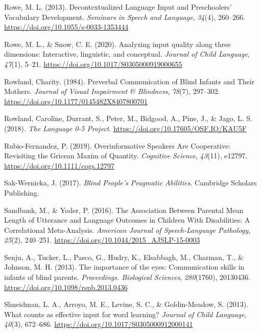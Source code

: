 \documentclass[
  man,floatsintext]{apa6}
\newlength{\cslhangindent}
\newlength{\cslentryspacingunit} %
\newenvironment{CSLReferences}[2] %
 {%
  \setlength{\parindent}{0pt}
  \ifodd #1
  \let\oldpar\par
  \def\par{\hangindent=\cslhangindent\oldpar}
  \fi
  \setlength{\parskip}{#2\cslentryspacingunit}
 }%
 {}
\begin{document}
\begin{CSLReferences}{1}{0}
\leavevmode{}%
Rowe, M. L. (2013). Decontextualized {Language Input} and {Preschoolers}' {Vocabulary Development}. \emph{Seminars in Speech and Language}, \emph{34}(4), 260--266. \url{https://doi.org/10.1055/s-0033-1353444}

\leavevmode{}%
Rowe, M. L., \& Snow, C. E. (2020). Analyzing input quality along three dimensions: Interactive, linguistic, and conceptual. \emph{Journal of Child Language}, \emph{47}(1), 5--21. \url{https://doi.org/10.1017/S0305000919000655}

\leavevmode{}%
Rowland, Charity. (1984). Preverbal {Communication} of {Blind Infants} and {Their Mothers}. \emph{Journal of Visual Impairment \& Blindness}, \emph{78}(7), 297--302. \url{https://doi.org/10.1177/0145482X8407800701}

\leavevmode{}%
Rowland, Caroline, Durrant, S., Peter, M., Bidgood, A., Pine, J., \& Jago, L. S. (2018). \emph{The {Language} 0-5 {Project}}. \url{https://doi.org/10.17605/OSF.IO/KAU5F}

\leavevmode{}%
Rubio-Fernandez, P. (2019). Overinformative {Speakers Are Cooperative}: {Revisiting} the {Gricean Maxim} of {Quantity}. \emph{Cognitive Science}, \emph{43}(11), e12797. \url{https://doi.org/10.1111/cogs.12797}

\leavevmode{}%
Sak-Wernicka, J. (2017). \emph{Blind {People}'s {Pragmatic Abilities}}. Cambridge Scholars Publishing.

\leavevmode{}%
Sandbank, M., \& Yoder, P. (2016). The {Association Between Parental Mean Length} of {Utterance} and {Language Outcomes} in {Children With Disabilities}: {A Correlational Meta-Analysis}. \emph{American Journal of Speech-Language Pathology}, \emph{25}(2), 240--251. \url{https://doi.org/10.1044/2015_AJSLP-15-0003}

\leavevmode{}%
Senju, A., Tucker, L., Pasco, G., Hudry, K., Elsabbagh, M., Charman, T., \& Johnson, M. H. (2013). The importance of the eyes: Communication skills in infants of blind parents. \emph{Proceedings. Biological Sciences}, \emph{280}(1760), 20130436. \url{https://doi.org/10.1098/rspb.2013.0436}

\leavevmode{}%
Shneidman, L. A., Arroyo, M. E., Levine, S. C., \& Goldin-Meadow, S. (2013). What counts as effective input for word learning? \emph{Journal of Child Language}, \emph{40}(3), 672--686. \url{https://doi.org/10.1017/S0305000912000141}


\end{CSLReferences}
\end{document}
